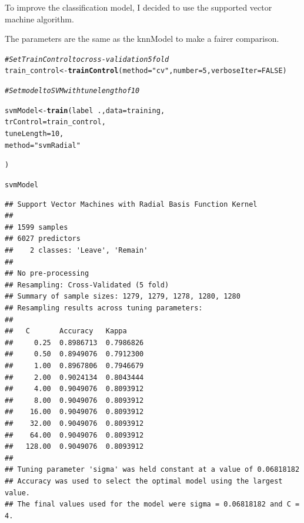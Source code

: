 \documentclass[10pt  ,usenames, dvipsnames]{article}\usepackage[]{graphicx}\usepackage[]{color}
\makeatletter
\newcommand{\hlnum}[1]{\textcolor[rgb]{0.686,0.059,0.569}{#1}}%
\newcommand{\hlstr}[1]{\textcolor[rgb]{0.192,0.494,0.8}{#1}}%
\newcommand{\hlcom}[1]{\textcolor[rgb]{0.678,0.584,0.686}{\textit{#1}}}%
\newcommand{\hlopt}[1]{\textcolor[rgb]{0,0,0}{#1}}%
\newcommand{\hlstd}[1]{\textcolor[rgb]{0.345,0.345,0.345}{#1}}%
\newcommand{\hlkwb}[1]{\textcolor[rgb]{0.69,0.353,0.396}{#1}}%
\newcommand{\hlkwc}[1]{\textcolor[rgb]{0.333,0.667,0.333}{#1}}%
\newcommand{\hlkwd}[1]{\textcolor[rgb]{0.737,0.353,0.396}{\textbf{#1}}}%
\newenvironment{kframe}{%
 \def\at@end@of@kframe{}%
 \ifinner\ifhmode%
  \def\at@end@of@kframe{\end{minipage}}%
  \begin{minipage}{\columnwidth}%
 \fi\fi%
 \def\FrameCommand##1{\hskip\@totalleftmargin \hskip-\fboxsep
 \colorbox{shadecolor}{##1}\hskip-\fboxsep
     \hskip-\linewidth \hskip-\@totalleftmargin \hskip\columnwidth}%
 \MakeFramed {\advance\hsize-\width
   \@totalleftmargin\z@ \linewidth\hsize
   \@setminipage}}%
 {\par\unskip\endMakeFramed%
 \at@end@of@kframe}
\newenvironment{knitrout}{}{} %
\makeatother
\begin{document}
To improve the classification model, I decided to use the supported vector machine algorithm.

The parameters are the same as the knnModel to make a fairer comparison.

\begin{knitrout}
\color{fgcolor}\begin{kframe}
\begin{alltt}
\hlcom{#Set Train Control to cross-validation 5 fold}
\hlstd{train_control}\hlkwb{<-} \hlkwd{trainControl}\hlstd{(}\hlkwc{method}\hlstd{=}\hlstr{"cv"}\hlstd{,} \hlkwc{number}\hlstd{=}\hlnum{5}\hlstd{,}\hlkwc{verboseIter}\hlstd{=}\hlnum{FALSE}\hlstd{)}

\hlcom{#Set model to SVM with tunelength of 10}

\hlstd{svmModel} \hlkwb{<-} \hlkwd{train}\hlstd{(label}\hlopt{~} \hlstd{.,} \hlkwc{data} \hlstd{= training,}
                  \hlkwc{trControl} \hlstd{= train_control,}
                  \hlkwc{tuneLength} \hlstd{=}\hlnum{10}\hlstd{,}
                  \hlkwc{method} \hlstd{=} \hlstr{"svmRadial"}

\hlstd{)}
\end{alltt}
\end{kframe}
\end{knitrout}



\begin{knitrout}
\color{fgcolor}\begin{kframe}
\begin{alltt}
\hlstd{svmModel}
\end{alltt}
\end{kframe}
\end{knitrout}

\begin{knitrout}
\color{fgcolor}\begin{kframe}
\begin{verbatim}
## Support Vector Machines with Radial Basis Function Kernel 
## 
## 1599 samples
## 6027 predictors
##    2 classes: 'Leave', 'Remain' 
## 
## No pre-processing
## Resampling: Cross-Validated (5 fold) 
## Summary of sample sizes: 1279, 1279, 1278, 1280, 1280 
## Resampling results across tuning parameters:
## 
##   C       Accuracy   Kappa    
##     0.25  0.8986713  0.7986826
##     0.50  0.8949076  0.7912300
##     1.00  0.8967806  0.7946679
##     2.00  0.9024134  0.8043444
##     4.00  0.9049076  0.8093912
##     8.00  0.9049076  0.8093912
##    16.00  0.9049076  0.8093912
##    32.00  0.9049076  0.8093912
##    64.00  0.9049076  0.8093912
##   128.00  0.9049076  0.8093912
## 
## Tuning parameter 'sigma' was held constant at a value of 0.06818182
## Accuracy was used to select the optimal model using the largest value.
## The final values used for the model were sigma = 0.06818182 and C = 4.
\end{verbatim}
\end{kframe}
\end{knitrout}
\end{document}
